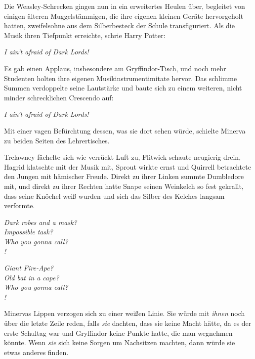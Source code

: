 Die Weasley-Schrecken gingen nun in ein erweitertes Heulen über, begleitet von einigen älteren Muggelstämmigen, die ihre eigenen kleinen Geräte hervorgeholt hatten, zweifelsohne aus dem Silberbesteck der Schule transfiguriert. Als die Musik ihren Tiefpunkt erreichte, schrie Harry Potter:

\begin{center}
\emph{I ain’t afraid of Dark Lords!}
\end{center}

Es gab einen Applaus, insbesondere am Gryffindor-Tisch, und noch mehr Studenten holten ihre eigenen Musikinstrumentimitate hervor. Das schlimme Summen verdoppelte seine Lautstärke und baute sich zu einem weiteren, nicht minder schrecklichen Crescendo auf:

\begin{center}
\emph{I ain’t afraid of Dark Lords!}
\end{center}

Mit einer vagen Befürchtung dessen, was sie dort sehen würde, schielte Minerva zu beiden Seiten des Lehrertisches.

Trelawney fächelte sich wie verrückt Luft zu, Flitwick schaute neugierig drein, Hagrid klatschte mit der Musik mit, Sprout wirkte ernst und Quirrell betrachtete den Jungen mit hämischer Freude. Direkt zu ihrer Linken summte Dumbledore mit, und direkt zu ihrer Rechten hatte Snape seinen Weinkelch so fest gekrallt, dass seine Knöchel weiß wurden und sich das Silber des Kelches langsam verformte.

\begin{center}
\emph{Dark robes and a mask?\\
Impossible task?\\
Who you gonna call?\\
!}

\emph{Giant Fire-Ape?\\
Old bat in a cape?\\
Who you gonna call?\\
!}
\end{center}

Minervas Lippen verzogen sich zu einer weißen Linie. Sie würde mit \emph{ihnen} noch über die letzte Zeile reden, falls \emph{sie} dachten, dass sie keine Macht hätte, da es der erste Schultag war und Gryffindor keine Punkte hatte, die man wegnehmen könnte. Wenn \emph{sie} sich keine Sorgen um Nachsitzen machten, dann würde sie etwas anderes finden.

